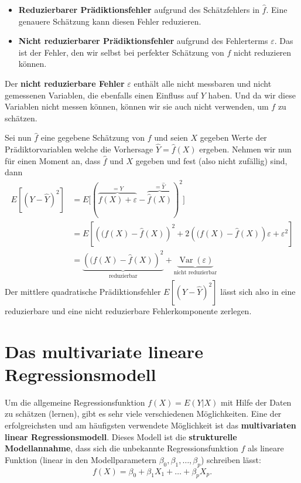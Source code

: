 \documentclass[
  ngerman,
]{book}
\providecommand{\tightlist}{%
  \setlength{\itemsep}{0pt}\setlength{\parskip}{0pt}}
\begin{document}
\begin{itemize}
\tightlist
\item
  \textbf{Reduzierbarer Prädiktionsfehler} aufgrund des Schätzfehlers in \(\hat{f}\). Eine genauere Schätzung kann diesen Fehler reduzieren.
\item
  \textbf{Nicht reduzierbarer Prädiktionsfehler} aufgrund des Fehlerterms \(\varepsilon\). Das ist der Fehler, den wir selbst bei perfekter Schätzung von \(f\) nicht reduzieren können.
\end{itemize}

Der \textbf{nicht reduzierbare Fehler} \(\varepsilon\) enthält alle nicht messbaren und nicht gemessenen Variablen, die ebenfalls einen Einfluss auf \(Y\) haben. Und da wir diese Variablen nicht messen können, können wir sie auch nicht verwenden, um \(f\) zu schätzen.

Sei nun \(\hat{f}\) eine gegebene Schätzung von \(f\) und seien \(X\) gegeben Werte der Prädiktorvariablen welche die Vorhersage \(\hat{Y}=\hat{f}(X)\) ergeben. Nehmen wir nun für einen Moment an, dass \(\hat{f}\) und \(X\) gegeben und fest (also nicht zufällig) sind, dann
\begin{align*}
E\left[(Y-\hat{Y})^2\right]
&=E\Big[(\overbrace{f(X)+\varepsilon}^{=Y} - \overbrace{\hat{f}(X)}^{=\hat{Y}})^2\Big]\\
&=E\left[\left((f(X)-\hat{f}(X)\right)^2+2\left((f(X)-\hat{f}(X)\right)\varepsilon+\varepsilon^2\right]\\
&=\underbrace{\left((f(X)-\hat{f}(X)\right)^2}_{\text{reduzierbar}}+\underbrace{\operatorname{Var}(\varepsilon)}_{\text{nicht reduzierbar}}
\end{align*}
Der mittlere quadratische Prädiktionsfehler \(E\left[(Y-\hat{Y})^2\right]\) lässt sich also in eine reduzierbare und eine nicht reduzierbare Fehlerkomponente zerlegen.

\hypertarget{das-multivariate-lineare-regressionsmodell}{%
\section{Das multivariate lineare Regressionsmodell}\label{das-multivariate-lineare-regressionsmodell}}

Um die allgemeine Regressionsfunktion \(f(X)=E(Y|X)\) mit Hilfe der Daten zu schätzen (lernen), gibt es sehr viele verschiedenen Möglichkeiten. Eine der erfolgreichsten und am häufigsten verwendete Möglichkeit ist das \textbf{multivariaten linear Regressionsmodell}. Dieses Modell ist die \textbf{strukturelle Modellannahme}, dass sich die unbekannte Regressionsfunktion \(f\) als lineare Funktion (linear in den Modellparametern \(\beta_0, \beta_1, \dots, \beta_p\)) schreiben lässt:
\[
f(X)=\beta_0+\beta_1X_1+\dots+\beta_pX_p.
\]
\end{document}
